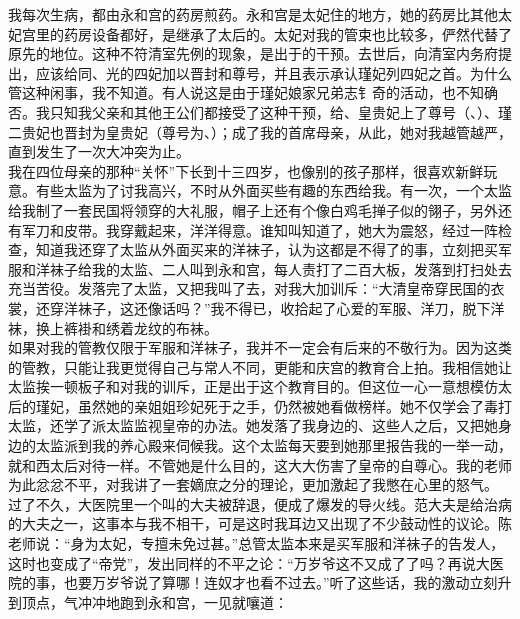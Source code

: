 我每次生病，都由永和宫的药房煎药。永和宫是太妃住的地方，她的药房比其他太妃宫里的药房设备都好，是继承了太后的。太妃对我的管束也比较多，俨然代替了原先的地位。这种不符清室先例的现象，是出于的干预。去世后，向清室内务府提出，应该给同、光的四妃加以晋封和尊号，并且表示承认瑾妃列四妃之首。为什么管这种闲事，我不知道。有人说这是由于瑾妃娘家兄弟志钅奇的活动，也不知确否。我只知我父亲和其他王公们都接受了这种干预，给、皇贵妃上了尊号（、）、瑾二贵妃也晋封为皇贵妃（尊号为、）；成了我的首席母亲，从此，她对我越管越严，直到发生了一次大冲突为止。\\

我在四位母亲的那种“关怀”下长到十三四岁，也像别的孩子那样，很喜欢新鲜玩意。有些太监为了讨我高兴，不时从外面买些有趣的东西给我。有一次，一个太监给我制了一套民国将领穿的大礼服，帽子上还有个像白鸡毛掸子似的翎子，另外还有军刀和皮带。我穿戴起来，洋洋得意。谁知叫知道了，她大为震怒，经过一阵检查，知道我还穿了太监从外面买来的洋袜子，认为这都是不得了的事，立刻把买军服和洋袜子给我的太监、二人叫到永和宫，每人责打了二百大板，发落到打扫处去充当苦役。发落完了太监，又把我叫了去，对我大加训斥：“大清皇帝穿民国的衣裳，还穿洋袜子，这还像话吗？”我不得已，收拾起了心爱的军服、洋刀，脱下洋袜，换上裤褂和绣着龙纹的布袜。\\

如果对我的管教仅限于军服和洋袜子，我并不一定会有后来的不敬行为。因为这类的管教，只能让我更觉得自己与常人不同，更能和庆宫的教育合上拍。我相信她让太监挨一顿板子和对我的训斥，正是出于这个教育目的。但这位一心一意想模仿太后的瑾妃，虽然她的亲姐姐珍妃死于之手，仍然被她看做榜样。她不仅学会了毒打太监，还学了派太监监视皇帝的办法。她发落了我身边的、这些人之后，又把她身边的太监派到我的养心殿来伺候我。这个太监每天要到她那里报告我的一举一动，就和西太后对待一样。不管她是什么目的，这大大伤害了皇帝的自尊心。我的老师为此忿忿不平，对我讲了一套嫡庶之分的理论，更加激起了我憋在心里的怒气。\\

过了不久，大医院里一个叫的大夫被辞退，便成了爆发的导火线。范大夫是给治病的大夫之一，这事本与我不相干，可是这时我耳边又出现了不少鼓动性的议论。陈老师说：“身为太妃，专擅未免过甚。”总管太监本来是买军服和洋袜子的告发人，这时也变成了“帝党”，发出同样的不平之论：“万岁爷这不又成了了吗？再说大医院的事，也要万岁爷说了算哪！连奴才也看不过去。”听了这些话，我的激动立刻升到顶点，气冲冲地跑到永和宫，一见就嚷道：\\

